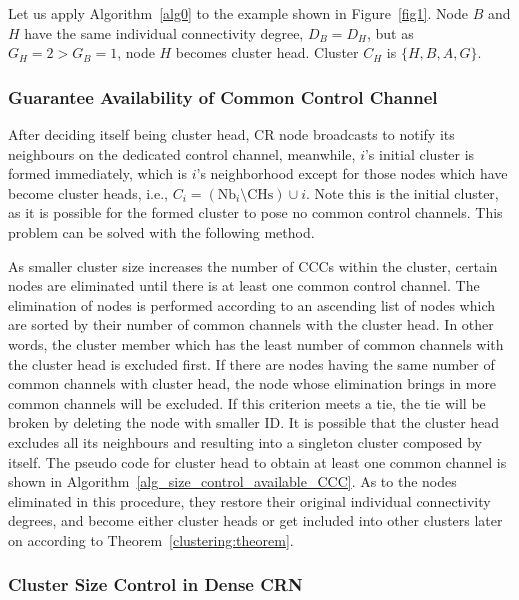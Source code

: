 \documentclass[10pt,journal,compsoc]{IEEEtran}
\theoremstyle{mytheoremstyle}
\theoremstyle{mytheoremstyle}
\theoremstyle{mytheoremstyle}
\newcommand{\ie}{i.e., }
\begin{document}
Let us apply Algorithm~\ref{alg0} to the example shown in Figure~\ref{fig1}.
Node $B$ and $H$ have the same individual connectivity degree, $D_B=D_H$, but as $G_H=2>G_B=1$, node $H$ becomes cluster head.
Cluster $C_H$ is $\{H, B, A, G\}$.
	




\subsubsection{Guarantee Availability of Common Control Channel}
After deciding itself being cluster head, CR node broadcasts to notify its neighbours on the dedicated control channel, meanwhile, $i$'s initial cluster is formed immediately, which is $i$'s neighborhood except for those nodes which have become cluster heads, \ie $C_i=(\text{Nb}_i\setminus \text{CHs})\cup i$.
Note this is the initial cluster, as it is possible for the formed cluster to pose no common control channels.
This problem can be solved with the following method.

As smaller cluster size increases the number of CCCs within the cluster, certain nodes are eliminated until there is at least one common control channel.
The elimination of nodes is performed according to an ascending list of nodes which are sorted by their number of common channels with the cluster head. 
In other words, the cluster member which has the least number of common channels with the cluster head is excluded first.
If there are nodes having the same number of common channels with cluster head, the node whose elimination brings in more common channels will be excluded.
If this criterion meets a tie, the tie will be broken by deleting the node with smaller ID.
It is possible that the cluster head excludes all its neighbours and resulting into a singleton cluster composed by itself.
The pseudo code for cluster head to obtain at least one common channel is shown in Algorithm~\ref{alg_size_control_available_CCC}.
As to the nodes eliminated in this procedure, they restore their original individual connectivity degrees, and become either cluster heads or get included into other clusters later on according to Theorem~\ref{clustering:theorem}.




\subsubsection{Cluster Size Control in Dense CRN}
\label{cluster_pruning}
\end{document}
